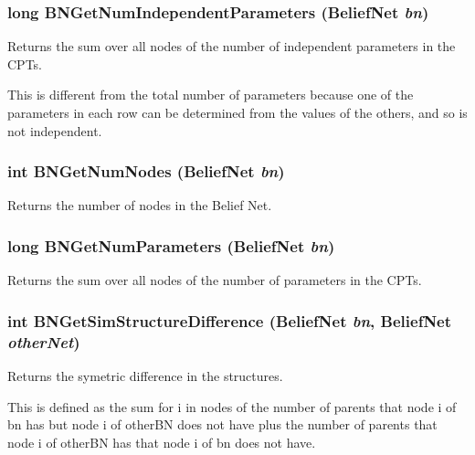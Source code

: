 \subsubsection{\setlength{\rightskip}{0pt plus 5cm}long BNGet\-Num\-Independent\-Parameters ({\bf Belief\-Net} {\em bn})}\label{BeliefNet_8h_a67}


Returns the sum over all nodes of the number of independent parameters in the CPTs. 

This is different from the total number of parameters because one of the parameters in each row can be determined from the values of the others, and so is not independent. 
\subsubsection{\setlength{\rightskip}{0pt plus 5cm}int BNGet\-Num\-Nodes ({\bf Belief\-Net} {\em bn})}\label{BeliefNet_8h_a57}


Returns the number of nodes in the Belief Net. 

\subsubsection{\setlength{\rightskip}{0pt plus 5cm}long BNGet\-Num\-Parameters ({\bf Belief\-Net} {\em bn})}\label{BeliefNet_8h_a68}


Returns the sum over all nodes of the number of parameters in the CPTs. 

\subsubsection{\setlength{\rightskip}{0pt plus 5cm}int BNGet\-Sim\-Structure\-Difference ({\bf Belief\-Net} {\em bn}, {\bf Belief\-Net} {\em other\-Net})}\label{BeliefNet_8h_a51}


Returns the symetric difference in the structures. 

This is defined as the sum for i in nodes of the number of parents that node i of bn has but node i of other\-BN does not have plus the number of parents that node i of other\-BN has that node i of bn does not have. 
